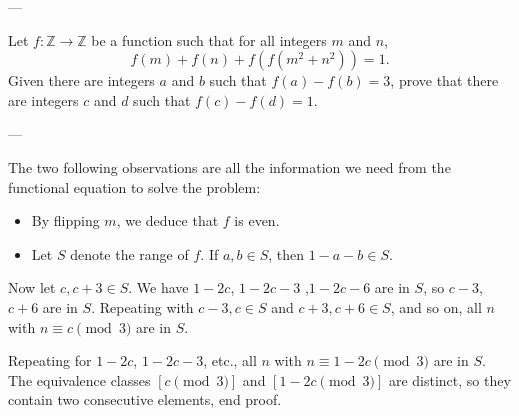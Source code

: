 
---

Let $f:\mathbb Z\to\mathbb Z$ be a function such that for all integers $m$ and $n$,
\[f(m)+f(n)+f(f(m^2+n^2))=1.\]
Given there are integers $a$ and $b$ such that $f(a)-f(b)=3$, prove that there are integers $c$ and $d$ such that $f(c)-f(d)=1$.

---

The two following observations are all the information we need from the functional equation to solve the problem:
\begin{itemize}[itemsep=0em]
    \item By flipping $m$, we deduce that $f$ is even.
    \item Let $S$ denote the range of $f$. If $a,b\in S$, then $1-a-b\in S$.
\end{itemize}
Now let $c,c+3\in S$. We have $1-2c$, $1-2c-3$ ,$1-2c-6$ are in $S$, so $c-3$, $c+6$ are in $S$. Repeating with $c-3,c\in S$ and $c+3,c+6\in S$, and so on, all $n$ with $n\equiv c\pmod3$ are in $S$.

Repeating for $1-2c$, $1-2c-3$, etc., all $n$ with $n\equiv1-2c\pmod3$ are in $S$. The equivalence classes $[c\pmod3]$ and $[1-2c\pmod3]$ are distinct, so they contain two consecutive elements, end proof.

